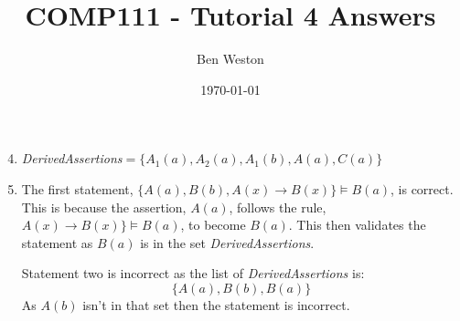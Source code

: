 \documentclass{article}
\title{COMP111 - Tutorial 4 Answers}
\author{Ben Weston}
\date{\today}
\begin{document}
\maketitle
\begin{enumerate}\setcounter{enumi}{3}
        \item \emph{DerivedAssertions}$=\{A_1(a),A_2(a),A_1(b),A(a),C(a)\}$
                \setcounter{enumi}{5}
        \item The first statement, $\{A(a),B(b),A(x)\rightarrow B(x)\}\models B(a)$, is correct. This is because the assertion, $A(a)$, follows the rule, $A(x)\rightarrow B(x)\}\models B(a)$, to become $B(a)$. This then validates the statement as $B(a)$ is in the set \emph{DerivedAssertions}. 

                Statement two is incorrect as the list of \emph{DerivedAssertions} is: $$\{A(a),B(b),B(a)\}$$ As $A(b)$ isn't in that set then the statement is incorrect.
\end{enumerate}
\end{document}
